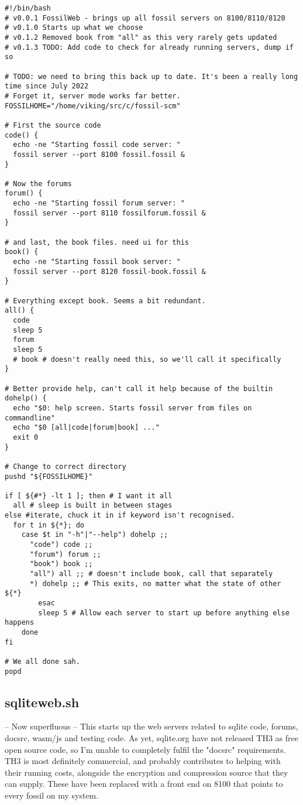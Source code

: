 \documentclass[11pt]{article}
\begin{document}
\begin{verbatim}
#!/bin/bash
# v0.0.1 FossilWeb - brings up all fossil servers on 8100/8110/8120
# v0.1.0 Starts up what we choose
# v0.1.2 Removed book from "all" as this very rarely gets updated
# v0.1.3 TODO: Add code to check for already running servers, dump if so

# TODO: we need to bring this back up to date. It's been a really long time since July 2022
# Forget it, server mode works far better.
FOSSILHOME="/home/viking/src/c/fossil-scm"

# First the source code
code() {
  echo -ne "Starting fossil code server: "
  fossil server --port 8100 fossil.fossil &
}

# Now the forums
forum() {
  echo -ne "Starting fossil forum server: "
  fossil server --port 8110 fossilforum.fossil &
}

# and last, the book files. need ui for this
book() {
  echo -ne "Starting fossil book server: "
  fossil server --port 8120 fossil-book.fossil &
}

# Everything except book. Seems a bit redundant.
all() {
  code
  sleep 5
  forum
  sleep 5
  # book # doesn't really need this, so we'll call it specifically
}

# Better provide help, can't call it help because of the builtin
dohelp() {
  echo "$0: help screen. Starts fossil server from files on commandline"
  echo "$0 [all|code|forum|book] ..."
  exit 0
}

# Change to correct directory
pushd "${FOSSILHOME}"

if [ ${#*} -lt 1 ]; then # I want it all
  all # sleep is built in between stages
else #iterate, chuck it in if keyword isn't recognised.
  for t in ${*}; do
    case $t in "-h"|"--help") dohelp ;;
      "code") code ;;
      "forum") forum ;;
      "book") book ;;
      "all") all ;; # doesn't include book, call that separately
      *) dohelp ;; # This exits, no matter what the state of other ${*}
		esac
		sleep 5 # Allow each server to start up before anything else happens
	done
fi

# We all done sah.
popd

\end{verbatim}

\subsection*{sqliteweb.sh}
\label{sec:org3f627ec}
-- Now superfluous --
This starts up the web servers related to sqlite code, forums, docsrc, wasm/js and testing code. As yet,
sqlite.org have not released TH3 as free open source code, so I'm unable to completely fulfil
the "docsrc" requirements. TH3 is most definitely commercial, and probably contributes to helping
with their running costs, alongside the encryption and compression source that they can supply.
These have been replaced with a front end on 8100 that points to every fossil on my system.
\end{document}
